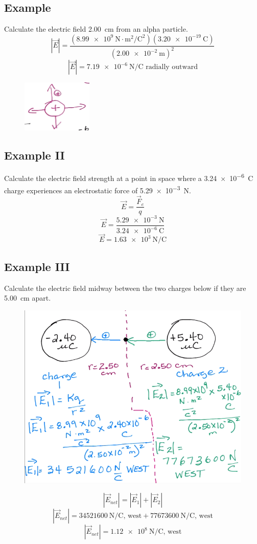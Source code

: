 \documentclass[a4paper,12pt]{article}
\begin{document}
\subsection{Example}
Calculate the electric field \SI{2.00}{\cm} from an alpha particle.
$$|\vec{E}| = \frac{(\SI{8.99e9}{\newton\cdot\m\squared\per\coulomb\squared})(\SI{3.20e-19}{\coulomb})}{(\SI{2.00e-2}{\m})^2}$$
$$|\vec{E}| = \SI{7.19e-6}{\newton\per\coulomb} \textrm{ radially outward}$$
\begin{figure}[H]
    \centering
    \includegraphics[width=0.3\textwidth]{fieldquestion}
\end{figure}

\subsection{Example II}
Calculate the electric field strength at a point in space where a \SI{3.24e-6}{\coulomb} charge experiences an electrostatic force of \SI{5.29e-3}{\newton}.
$$\vec{E} = \frac{\vec{F}_e}{q}$$
$$\vec{E} = \frac{\SI{5.29e-3}{\newton}}{\SI{3.24e-6}{\coulomb}}$$
$$\vec{E} = \SI{1.63e3}{\newton\per\coulomb}$$

\pagebreak
\subsection{Example III}
Calculate the electric field midway between the two charges below if they are \SI{5.00}{\cm} apart.
\begin{figure}[H]
    \centering
    \includegraphics[width=\textwidth]{fieldquestion3}
\end{figure}

$$|\vec{E}_{net}| = |\vec{E}_1| + |\vec{E}_2|$$
$$|\vec{E}_{net}| = \SI{34521600}{\newton\per\coulomb}\textrm{, west} + \SI{77673600}{\newton\per\coulomb}\textrm{, west}$$
$$|\vec{E}_{net}| = \SI{1.12e8}{\newton\per\coulomb}\textrm{, west}$$
\end{document}
